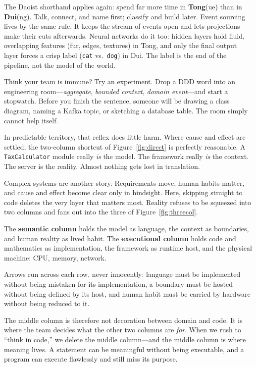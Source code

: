 \documentclass[10pt,a4paper]{article}
\newcounter{topic}
\newcounter{fig}
\newcommand{\code}[1]{\texttt{#1}}
\begin{document}
The Daoist shorthand applies again: spend far more time in \textbf{Tong}(ue) than in \textbf{Dui}(ng). Talk, connect, and name first; classify and build later. Event sourcing lives by the same rule. It keeps the stream of events open and lets projections make their cuts afterwards. Neural networks do it too: hidden layers hold fluid, overlapping features (fur, edges, textures) in Tong, and only the final output layer forces a crisp label (\code{cat} vs.\ \code{dog}) in Dui. The label is the end of the pipeline, not the model of the world.

Think your team is immune? Try an experiment. Drop a DDD word into an engineering room—\emph{aggregate}, \emph{bounded context}, \emph{domain event}—and start a stopwatch. Before you finish the sentence, someone will be drawing a class diagram, naming a Kafka topic, or sketching a database table. The room simply cannot help itself.

In predictable territory, that reflex does little harm. Where cause and effect are settled, the two-column shortcut of Figure~\ref{fig:direct} is perfectly reasonable. A \code{TaxCalculator} module really \emph{is} the model. The framework really \emph{is} the context. The server is the reality. Almost nothing gets lost in translation.

Complex systems are another story. Requirements move, human habits matter, and cause and effect become clear only in hindsight. Here, skipping straight to code deletes the very layer that matters most. Reality refuses to be squeezed into two columns and fans out into the three of Figure~\ref{fig:threecol}.

The \textbf{semantic column} holds the model as language, the context as boundaries, and human reality as lived habit. The \textbf{executional column} holds code and mathematics as implementation, the framework as runtime host, and the physical machine: CPU, memory, network.

Arrows run across each row, never innocently: language must be implemented without being mistaken for its implementation, a boundary must be hosted without being defined by its host, and human habit must be carried by hardware without being reduced to it.

The middle column is therefore not decoration between domain and code. It is where the team decides what the other two columns are \emph{for}. When we rush to “think in code,” we delete the middle column—and the middle column is where meaning lives. A statement can be meaningful without being executable, and a program can execute flawlessly and still miss its purpose.
\end{document}

